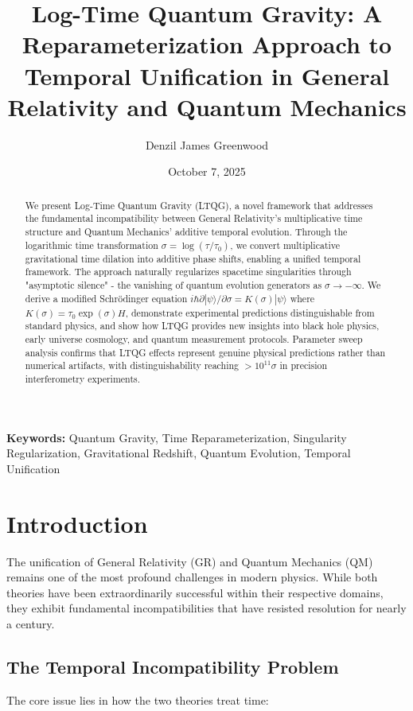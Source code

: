 \documentclass[12pt,a4paper]{article}
\title{\textbf{Log-Time Quantum Gravity: A Reparameterization Approach to Temporal Unification in General Relativity and Quantum Mechanics}}
\author[1]{Denzil James Greenwood}
\affil[1]{Independent Researcher}
\date{October 7, 2025}
\begin{document}
\maketitle

\begin{abstract}
We present Log-Time Quantum Gravity (LTQG), a novel framework that addresses the fundamental incompatibility between General Relativity's multiplicative time structure and Quantum Mechanics' additive temporal evolution. Through the logarithmic time transformation $\sigma = \log(\tau/\tau_0)$, we convert multiplicative gravitational time dilation into additive phase shifts, enabling a unified temporal framework. The approach naturally regularizes spacetime singularities through "asymptotic silence" - the vanishing of quantum evolution generators as $\sigma \to -\infty$. We derive a modified Schrödinger equation $i\hbar \partial|\psi\rangle/\partial\sigma = K(\sigma)|\psi\rangle$ where $K(\sigma) = \tau_0 \exp(\sigma) H$, demonstrate experimental predictions distinguishable from standard physics, and show how LTQG provides new insights into black hole physics, early universe cosmology, and quantum measurement protocols. Parameter sweep analysis confirms that LTQG effects represent genuine physical predictions rather than numerical artifacts, with distinguishability reaching $>10^{11}\sigma$ in precision interferometry experiments.
\end{abstract}

\textbf{Keywords:} Quantum Gravity, Time Reparameterization, Singularity Regularization, Gravitational Redshift, Quantum Evolution, Temporal Unification

\section{Introduction}

The unification of General Relativity (GR) and Quantum Mechanics (QM) remains one of the most profound challenges in modern physics. While both theories have been extraordinarily successful within their respective domains, they exhibit fundamental incompatibilities that have resisted resolution for nearly a century.

\subsection{The Temporal Incompatibility Problem}

The core issue lies in how the two theories treat time:
\end{document}
